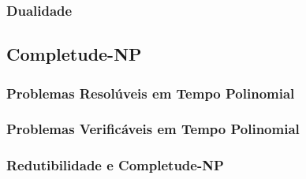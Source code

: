\documentclass[11pt]{article}
\begin{document}
\subsubsection{Dualidade}

\newpage

\subsection{Completude-NP} 

\subsubsection{Problemas Resolúveis em Tempo Polinomial}

\subsubsection{Problemas Verificáveis em Tempo Polinomial}

\subsubsection{Redutibilidade e Completude-NP}

\newpage

\end{document}
